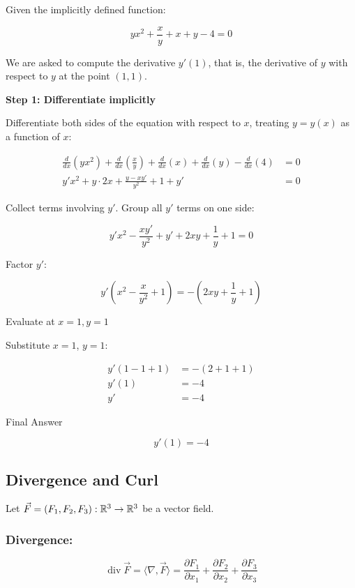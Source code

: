 Given the implicitly defined function:

\[
    y x^2 + \frac{x}{y} + x + y - 4 = 0
\]

We are asked to compute the derivative \( y'(1) \), that is, the derivative of \(y\) 
with respect to \(y\) at the point \( (1, 1) \).

\textbf{Step 1: Differentiate implicitly}

Differentiate both sides of the equation with respect to \(x\), 
treating \( y = y(x) \) as a function of \(x\):

\begin{align*}
    \frac{d}{dx}(y x^2) + \frac{d}{dx}\left(\frac{x}{y}\right) + \frac{d}{dx}(x) + \frac{d}{dx}(y) - \frac{d}{dx}(4) &= 0 \\
    y' x^2 + y \cdot 2x + \frac{y - x y'}{y^2} + 1 + y' &= 0
\end{align*}

Collect terms involving \( y' \). Group all \( y' \) terms on one side:

\[
    y' x^2 - \frac{x y'}{y^2} + y' + 2xy + \frac{1}{y} + 1 = 0
\]

Factor \( y' \):

\[
    y' \left(x^2 - \frac{x}{y^2} + 1\right) = -\left(2xy + \frac{1}{y} + 1\right)
\]

Evaluate at \( x = 1, y = 1 \)

Substitute \( x = 1 \), \( y = 1 \):

\begin{align*}
    y' (1 - 1 + 1) &= - (2 + 1 + 1) \\
    y' (1) &= -4 \\
    y' &= -4
\end{align*}

Final Answer

\[
    y'(1) = -4
\]

\subsection{Divergence and Curl}

Let \( \vec{F} = (F_1, F_2, F_3) : \mathbb{R}^3 \to \mathbb{R}^3 \) be a vector field.

\subsubsection{Divergence:}

\[
    \operatorname{div} \vec{F} = \langle\nabla, \vec{F}\rangle = \frac{\partial F_1}{\partial x_1} + 
    \frac{\partial F_2}{\partial x_2} + \frac{\partial F_3}{\partial x_3}
\]

